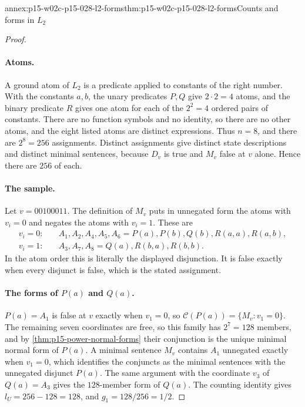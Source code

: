 \begin{annexitem}{annex:p15-w02c-p15-028-l2-forms}{thm:p15-w02c-p15-028-l2-forms}{Counts and forms in \(L_2\)}
\begin{proof}
\paragraph{Atoms.}
A ground atom of \(L_2\) is a predicate applied to constants of the
right number. With the constants \(a,b\), the unary predicates \(P,Q\)
give \(2\cdot 2=4\) atoms, and the binary predicate \(R\) gives one
atom for each of the \(2^2=4\) ordered pairs of constants. There are no
function symbols and no identity, so there are no other atoms, and the
eight listed atoms are distinct expressions. Thus \(n=8\), and there are
\(2^8=256\) assignments. Distinct assignments give distinct state
descriptions and distinct minimal sentences, because \(D_v\) is true
and \(M_v\) false at \(v\) alone. Hence there are \(256\) of each.

\paragraph{The sample.}
Let \(v=00100011\). The definition of \(M_v\) puts in unnegated form
the atoms with \(v_i=0\) and negates the atoms with \(v_i=1\). These
are
\[
\begin{aligned}
 v_i=0:&\quad A_1,A_2,A_4,A_5,A_6
   =P(a),P(b),Q(b),R(a,a),R(a,b),\\
 v_i=1:&\quad A_3,A_7,A_8=Q(a),R(b,a),R(b,b).
\end{aligned}
\]
In the atom order this is literally the displayed disjunction. It is false
exactly when every disjunct is false, which is the stated assignment.

\paragraph{The forms of \(P(a)\) and \(Q(a)\).}
\(P(a)=A_1\) is false at \(v\) exactly when \(v_1=0\), so
\(\mathcal C(P(a))=\{M_v:v_1=0\}\). The remaining seven coordinates are
free, so this family has \(2^7=128\) members, and by
\cref{thm:p15-power-normal-forms} their conjunction is the unique
minimal normal form of \(P(a)\). A minimal sentence \(M_v\) contains
\(A_1\) unnegated exactly when \(v_1=0\), which identifies the
conjuncts as the minimal sentences with the unnegated disjunct
\(P(a)\). The same argument with the coordinate \(v_3\) of
\(Q(a)=A_3\) gives the \(128\)-member form of \(Q(a)\). The counting
identity gives \(l_U=256-128=128\), and \(g_1=128/256=1/2\).


\end{proof}
\end{annexitem}
